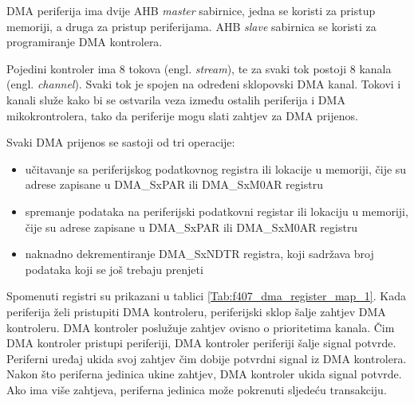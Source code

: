 DMA periferija ima dvije AHB \textit{master} sabirnice, jedna se koristi za pristup memoriji, a druga za pristup periferijama. AHB \textit{slave} sabirnica se koristi za programiranje DMA kontrolera.

Pojedini kontroler ima 8 tokova (engl. \textit{stream}), te za svaki tok postoji 8 kanala (engl. \textit{channel}). Svaki tok je spojen na određeni sklopovski DMA kanal. Tokovi i kanali služe kako bi se ostvarila veza između ostalih periferija i DMA mikokrontrolera, tako da periferije mogu slati zahtjev za DMA prijenos. %

Svaki DMA prijenos se sastoji od tri operacije:
\begin{itemize}
	\item učitavanje sa periferijskog podatkovnog registra ili lokacije u memoriji, čije su adrese zapisane u DMA\_SxPAR ili DMA\_SxM0AR registru
	\item spremanje podataka na periferijski podatkovni registar ili lokaciju u memoriji, čije su adrese zapisane u DMA\_SxPAR ili DMA\_SxM0AR registru
	\item naknadno dekrementiranje DMA\_SxNDTR registra, koji sadržava broj podataka koji se još trebaju prenjeti
\end{itemize}
Spomenuti registri su prikazani u tablici \ref{Tab:f407_dma_register_map_1}. Kada periferija želi pristupiti DMA kontroleru, periferijski sklop šalje zahtjev DMA kontroleru. DMA kontroler poslužuje zahtjev ovisno o prioritetima kanala. Čim DMA kontroler pristupi periferiji, DMA kontroler periferiji šalje signal potvrde. Periferni uređaj ukida svoj zahtjev čim dobije potvrdni signal iz DMA kontrolera. Nakon što periferna jedinica ukine zahtjev, DMA kontroler ukida signal potvrde. Ako ima više zahtjeva, periferna jedinica može pokrenuti sljedeću transakciju.

